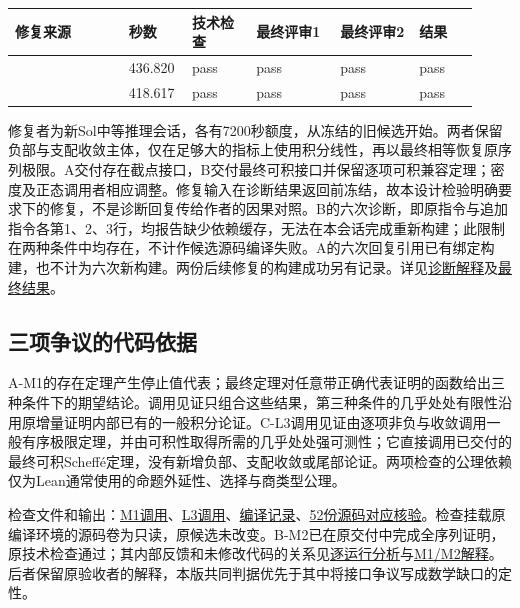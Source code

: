 \begingroup\small\setlength{\tabcolsep}{3pt}\renewcommand{\arraystretch}{1.14}
\par\nopagebreak\medskip\noindent\begin{minipage}[t]{\linewidth}
\begin{tabular}{>{\raggedright\arraybackslash}p{0.23\linewidth}>{\raggedright\arraybackslash}p{0.11\linewidth}>{\raggedright\arraybackslash}p{0.13\linewidth}>{\raggedright\arraybackslash}p{0.17\linewidth}>{\raggedright\arraybackslash}p{0.16\linewidth}>{\raggedright\arraybackslash}p{0.12\linewidth}}
\toprule
\textbf{修复来源} & \textbf{秒数} & \textbf{技术检查} & \textbf{最终评审1} & \textbf{最终评审2} & \textbf{结果}\\\midrule

{A} & {436.820} & {pass} & {pass} & {pass} & {pass}\\
{B} & {418.617} & {pass} & {pass} & {pass} & {pass}\\
\bottomrule\end{tabular}\end{minipage}\par\medskip\endgroup
修复者为新Sol中等推理会话，各有7200秒额度，从冻结的旧候选开始。两者保留负部与支配收敛主体，仅在足够大的指标上使用积分线性，再以最终相等恢复原序列极限。A交付存在截点接口，B交付最终可积接口并保留逐项可积兼容定理；密度及正态调用者相应调整。修复输入在诊断结果返回前冻结，故本设计检验明确要求下的修复，不是诊断回复传给作者的因果对照。B的六次诊断，即原指令与追加指令各第1、2、3行，均报告缺少依赖缓存，无法在本会话完成重新构建；此限制在两种条件中均存在，不计作候选源码编译失败。A的六次回复引用已有绑定构建，也不计为六次新构建。两份后续修复的构建成功另有记录。详见\href{verification/revision23/analysis/L3_INTERPRETATION.zh-CN.md}{诊断解释}及\href{verification/revision23/RESULTS.json}{最终结果}。

\subsection[三项争议的代码依据]{\texorpdfstring{\protect\hypertarget{q5}{}三项争议的代码依据}{三项争议的代码依据}}
A-M1的存在定理产生停止值代表；最终定理对任意带正确代表证明的函数给出三种条件下的期望结论。调用见证只组合这些结果，第三种条件的几乎处处有限性沿用原增量证明内部已有的一般积分论证。C-L3调用见证由逐项非负与收敛调用一般有序极限定理，并由可积性取得所需的几乎处处强可测性；它直接调用已交付的最终可积Scheffé定理，没有新增负部、支配收敛或尾部论证。两项检查的公理依赖仅为Lean通常使用的命题外延性、选择与商类型公理。

检查文件和输出：\href{verification/revision23/evaluation/M1.lean}{M1调用}、\href{verification/revision23/evaluation/L3.lean}{L3调用}、\href{verification/revision23/evaluation/caller_checks.json}{编译记录}、\href{verification/revision23/evaluation/compiled_source_binding.json}{52份源码对应核验}。检查挂载原编译环境的源码卷为只读，原候选未改变。B-M2已在原交付中完成全序列证明，原技术检查通过；其内部反馈和未修改代码的关系见\href{verification/revision23/analysis/RUN_DETAILS.zh-CN.md}{逐运行分析}与\href{verification/revision23/analysis/M1A_M2B_INTERPRETATION.zh-CN.md}{M1/M2解释}。后者保留原验收者的解释，本版共同判据优先于其中将接口争议写成数学缺口的定性。

